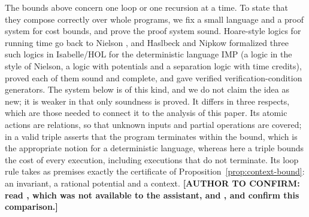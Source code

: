 \documentclass[oneside,english]{amsart}
\numberwithin{equation}{section}
\numberwithin{figure}{section}
\theoremstyle{plain}
\theoremstyle{definition}
\theoremstyle{plain}
\theoremstyle{remark}
\theoremstyle{plain}
\theoremstyle{definition}
\theoremstyle{plain}
\theoremstyle{remark}
\newcommand{\authortodo}[1]{\textbf{[AUTHOR TO CONFIRM: #1]}}
\begin{document}
The bounds above concern one loop or one recursion at a time. To state that they compose correctly over whole programs, we fix a small language and a proof system for cost bounds, and prove the proof system sound. Hoare-style logics for running time go back to Nielson \cite{nielson1987hoare}, and Haslbeck and Nipkow \cite{haslbeck2018hoare} formalized three such logics in Isabelle/HOL for the deterministic language IMP (a logic in the style of Nielson, a logic with potentials and a separation logic with time credits), proved each of them sound and complete, and gave verified verification-condition generators. The system below is of this kind, and we do not claim the idea as new; it is weaker in that only soundness is proved. It differs in three respects, which are those needed to connect it to the analysis of this paper. Its atomic actions are relations, so that unknown inputs and partial operations are covered; in \cite{haslbeck2018hoare} a valid triple asserts that the program terminates within the bound, which is the appropriate notion for a deterministic language, whereas here a triple bounds the cost of every execution, including executions that do not terminate. Its loop rule takes as premises exactly the certificate of Proposition~\ref{prop:context-bound}: an invariant, a rational potential and a context. \authortodo{read \cite{nielson1987hoare}, which was not available to the assistant, and \cite{haslbeck2018hoare}, and confirm this comparison.}
\end{document}
